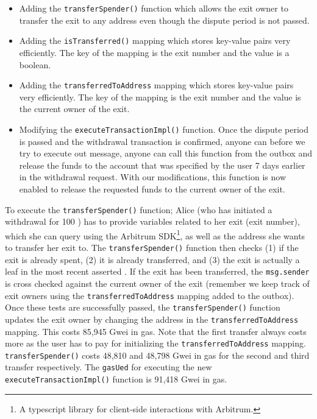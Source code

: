 \begin{itemize}
\item Adding the \texttt{transferSpender()} function which allows the exit owner to transfer the exit to any \layerone address even though the dispute period is not passed.
\item Adding the \texttt{isTransferred()} mapping which stores key-value pairs very efficiently. The key of the mapping is the exit number and the value is a boolean.
\item Adding the \texttt{transferredToAddress} mapping which stores key-value pairs very efficiently. The key of the mapping is the exit number and the value is the current owner of the exit.
\item Modifying the \texttt{executeTransactionImpl()} function. Once the dispute period is passed and the withdrawal transaction is confirmed, anyone can before we try to execute out message, anyone can call this function from the outbox and release the funds to the account that was specified by the user 7 days earlier in the \layertwo withdrawal request. With our modifications, this function is now enabled to release the requested funds to the current owner of the exit.
 \end{itemize}
To execute the \texttt{transferSpender()} function; Alice (who has initiated a withdrawal for 100 \ethtwo) has to provide variables related to her exit (\eg exit number), which she can query using the Arbitrum SDK\footnote{A typescript library for client-side interactions with Arbitrum.}, as well as the \layerone address she wants to transfer her exit to. The \texttt{transferSpender()} function then checks (1) if the exit is already spent, (2) it is already transferred, and (3) the exit is actually a leaf in the most recent asserted \rblock. If the exit has been transferred, the \texttt{msg.sender} is cross checked against the current owner of the exit (remember we keep track of exit owners using the \texttt{transferredToAddress} mapping added to the outbox). Once these tests are successfully passed, the \texttt{transferSpender()} function updates the exit owner by changing the address in the \texttt{transferredToAddress} mapping. This costs  85,945 Gwei in \layerone gas. Note that the first transfer always costs more as the user has to pay for initializing the \texttt{transferredToAddress} mapping. \texttt{transferSpender()} costs 48,810 and 48,798 Gwei in \layerone gas for the second and third transfer respectively. The \texttt{gasUed} for executing the new \texttt{executeTransactionImpl()} function is 91,418 Gwei in \layerone gas.


